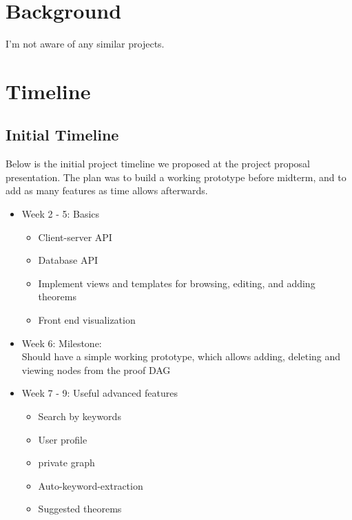 \documentclass{acm_proc_article-sp}
\begin{document}
\section{Background}
I'm not aware of any similar projects.

\section{Timeline}
\subsection{Initial Timeline}
Below is the initial project timeline we proposed at the project proposal presentation. The plan was to build a working prototype before midterm, and to add as many features as time allows afterwards.  
\begin{itemize}
\item Week 2 - 5: Basics
\begin{itemize}
\item Client-server API
\item Database API
\item Implement views and templates for browsing, editing, and adding theorems
\item Front end visualization
\end{itemize}
\item Week 6: Milestone:\\
Should have a simple working prototype, which allows adding, deleting and viewing nodes from the proof DAG
\item Week 7 - 9: Useful advanced features
\begin{itemize}
\item Search by keywords
\item User profile
\item private graph
\item Auto-keyword-extraction
\item Suggested theorems
\end{itemize}
\end{itemize}
\end{document}
